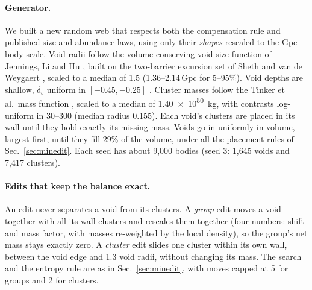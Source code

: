 \documentclass[aps,prd,twocolumn,nofootinbib,superscriptaddress,floatfix]{revtex4-2}
\begin{document}
\paragraph*{Generator.} We built a new random web that respects both the compensation rule and published size and abundance laws, using only their \emph{shapes} rescaled to the Gpc body scale. Void radii follow the volume-conserving void size function of Jennings, Li and Hu \cite{Jennings2013}, built on the two-barrier excursion set of Sheth and van de Weygaert \cite{ShethvdW2004}, scaled to a median of \SI{1.5}{\Gpc} (1.36--2.14\,Gpc for 5--95\%). Void depths are shallow, $\delta_v$ uniform in $[-0.45,-0.25]$ \cite{ClampittJain2015}. Cluster masses follow the Tinker et al.\ mass function \cite{Tinker2008}, scaled to a median of \SI{1.40e50}{\kilo\gram}, with contrasts log-uniform in 30--300 (median radius \SI{0.155}{\Gpc}). Each void's clusters are placed in its wall until they hold exactly its missing mass. Voids go in uniformly in volume, largest first, until they fill 29\% of the volume, under all the placement rules of Sec.~\ref{sec:minedit}. Each seed has about 9,000 bodies (seed 3: 1,645 voids and 7,417 clusters).

\paragraph*{Edits that keep the balance exact.} An edit never separates a void from its clusters. A \emph{group} edit moves a void together with all its wall clusters and rescales them together (four numbers: shift and mass factor, with masses re-weighted by the local density), so the group's net mass stays exactly zero. A \emph{cluster} edit slides one cluster within its own wall, between the void edge and 1.3 void radii, without changing its mass. The search and the entropy rule are as in Sec.~\ref{sec:minedit}, with moves capped at \SI{5}{\Gpc} for groups and \SI{2}{\Gpc} for clusters.
\end{document}
